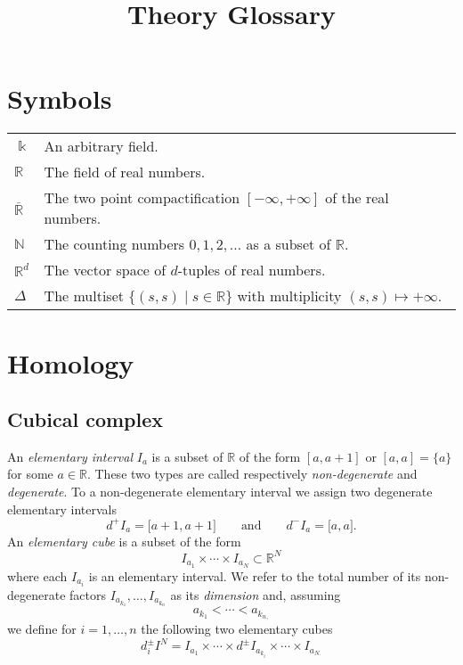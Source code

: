 \documentclass{amsart}
\begin{document}
	
	\title{Theory Glossary}
	\maketitle
	
	\section{Symbols}
	
	\begin{tabular}{ l l}
		$\Bbbk$ & An arbitrary field. \\
		$\mathbb R$ & The field of real numbers. \\
		$\overline{\mathbb R}$ & The two point compactification $[-\infty, +\infty]$ of the real numbers. \\
		$\mathbb N$ & The counting numbers $0,1,2, \ldots$ as a subset of $\mathbb R$. \\
		$\mathbb R^d$ & The vector space of $d$-tuples of real numbers. \\
		$\Delta$ & The 
		multiset $ \lbrace (s, s) \mid s \in \mathbb{R} \rbrace $ with multiplicity $ ( s,s ) \mapsto +\infty$.
	\end{tabular}
	
	\section{Homology}
	
	\subsection*{Cubical complex} \label{cubical_complex}
	
	An \textit{elementary interval} $I_a$ is a subset of $\mathbb{R}$ of the form $[a, a+1]$ or $[a,a] = \{a\}$ for some $a \in \mathbb{R}$. These two types are called respectively \textit{non-degenerate} and \textit{degenerate}. To a non-degenerate elementary interval we assign two degenerate elementary intervals
	\begin{equation*}
	d^+ I_a = \lbrack a+1, a+1 \rbrack \qquad \text{and} \qquad d^- I_a = \lbrack a, a \rbrack.
	\end{equation*}
	An \textit{elementary cube} is a subset of the form 
	\begin{equation*}
	I_{a_1} \times \cdots \times I_{a_N} \subset \mathbb{R}^N
	\end{equation*}
	where each $I_{a_i}$ is an elementary interval. We refer to the total number of its non-degenerate factors $I_{a_{k_1}}, \dots, I_{a_{k_n}}$ as its \textit{dimension} and, assuming
	\begin{equation*}
	a_{k_1} < \cdots < a_{k_{n,}}
	\end{equation*}
	we define for $i = 1, \dots, n$ the following two elementary cubes
	\begin{equation*}
	d_i^\pm I^N = I_{a_1} \times \cdots \times d^\pm I_{a_{k_i}} \times \cdots \times I_{a_{N.}}
	\end{equation*}
	
\end{document}
